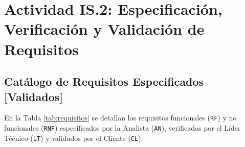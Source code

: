 \documentclass[11pt,a4paper]{article}
\begin{document}
\section{Actividad IS.2: Especificación, Verificación y Validación de Requisitos}

\subsection{Catálogo de Requisitos Especificados [Validados]}
En la Tabla \ref{tab:requisitos} se detallan los requisitos funcionales (\texttt{RF}) y no funcionales (\texttt{RNF}) especificados por la Analista (\texttt{AN}), verificados por el Líder Técnico (\texttt{LT}) y validados por el Cliente (\texttt{CL}).
\end{document}
